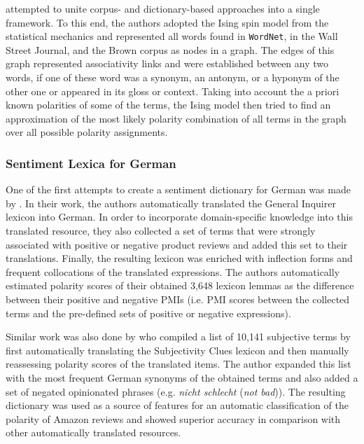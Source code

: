 \citet{Takamura:05} attempted to unite corpus- and dictionary-based
approaches into a single framework.  To this end, the authors adopted
the Ising spin model from the statistical mechanics and represented
all words found in \texttt{WordNet}, in the Wall Street Journal, and
the Brown corpus as nodes in a graph.  The edges of this graph
represented associativity links and were established between any two
words, if one of these word was a synonym, an antonym, or a hyponym of
the other one or appeared in its gloss or context.  Taking into
account the a priori known polarities of some of the terms, the Ising
model then tried to find an approximation of the most likely polarity
combination of all terms in the graph over all possible polarity
assignments.

\subsubsection{Sentiment Lexica for German}

One of the first attempts to create a sentiment dictionary for German
was made by \citet{Remus:10}.  In their work, the authors
automatically translated the General Inquirer lexicon \citep{Stone:66}
into German.  In order to incorporate domain-specific knowledge into
this translated resource, they also collected a set of terms that were
strongly associated with positive or negative product reviews and
added this set to their translations.  Finally, the resulting lexicon
was enriched with inflection forms and frequent collocations of the
translated expressions.  The authors automatically estimated polarity
scores of their obtained 3,648 lexicon lemmas as the difference
between their positive and negative PMIs (i.e. PMI scores between the
collected terms and the pre-defined sets of positive or negative
expressions).

Similar work was also done by \citet{Waltinger:10} who compiled a list
of 10,141 subjective terms by first automatically translating the
Subjectivity Clues lexicon \citep{Wilson:05} and then manually
reassessing polarity scores of the translated items.  The author
expanded this list with the most frequent German synonyms of the
obtained terms and also added a set of negated opinionated phrases
(e.g. \emph{nicht schlecht} (\emph{not bad})).  The resulting
dictionary was used as a source of features for an automatic
classification of the polarity of Amazon reviews and showed superior
accuracy in comparison with other automatically translated resources.

